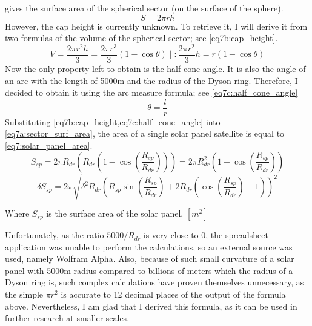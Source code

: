 \documentclass[stu, 11pt, a4paper, floatsintext, noextraspace]{apa7}
\begin{document}
	 gives the surface area of the spherical sector (on the surface of the sphere).
	\begin{equation}
		\label{eq7a:sector_surf_area}
		\tag{7.a}
		 S=2\pi rh
	\end{equation}
	However, the cap height is currently unknown. To retrieve it, I will derive it from two formulas of the volume of the spherical sector; see \cref{eq7b:cap_height}.
	\begin{equation}
		\label{eq7b:cap_height}
		\tag{7.b}
		V=\frac{2\pi r^2h}{3}=\frac{2\pi r^3}{3}\left(1-\cos\theta\right)\;|\;:\frac{2\pi r^2}{3}
		h = r\left(1-\cos\theta\right)
	\end{equation}
	Now the only property left to obtain is the half cone angle. It is also the angle of an arc with the length of 5000m and the radius of the Dyson ring. Therefore, I decided to obtain it using the arc measure formula; see \cref{eq7c:half_cone_angle}
	\begin{equation}
		\label{eq7c:half_cone_angle}
		\tag{7.c}
		\theta = \frac{l}{r}
	\end{equation}
	Substituting \cref{eq7b:cap_height,eq7c:half_cone_angle} into \cref{eq7a:sector_surf_area}, the area of a single solar panel satellite is equal to \cref{eq7:solar_panel_area}.
	\begin{equation}
		\label{eq7:solar_panel_area}
		S_{sp}=2\pi R_{dr} \left(R_{dr}\left(1-\cos\left(\frac{R_{sp}}{R_{dr}}\right)\right)\right)=2\pi R_{dr}^2\left(1-\cos\left(\frac{R_{sp}}{R_{dr}}\right)\right)
	\end{equation}
	\begin{equation*}
		\delta S_{sp}=2\pi\sqrt{\delta^2R_{dr}\left(R_{sp}\sin\left(\frac{R_{sp}}{R_{dr}}\right)+2R_{dr}\left(\cos\left(\frac{R_{sp}}{R_{dr}}\right)-1\right)\right)^2}
	\end{equation*}
	\begin{center}
		Where $S_{sp}$ is the surface area of the solar panel, $[m^2]$
	\end{center}
	Unfortunately, as the ratio $5000/R_{dr}$ is very close to 0, the spreadsheet application was unable to perform the calculations, so an external source was used, namely Wolfram Alpha. Also, because of such small curvature of a solar panel with 5000m radius compared to billions of meters which the radius of a Dyson ring is, such complex calculations have proven themselves unnecessary, as the simple $\pi r^2$ is accurate to 12 decimal places of the output of the formula above. Nevertheless, I am glad that I derived this formula, as it can be used in further research at smaller scales.
\end{document}
